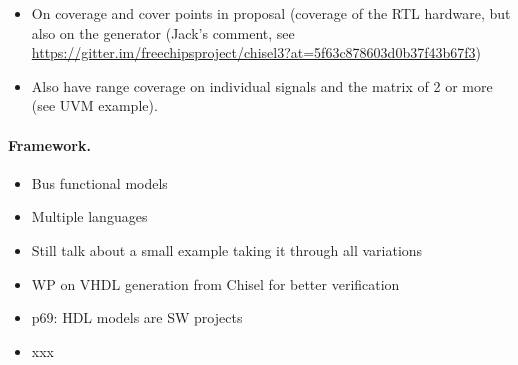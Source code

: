 \documentclass[fleqn,12pt]{article}
\begin{document}
\begin{itemize}
\item On coverage and cover points in proposal (coverage of the RTL hardware, but also on the generator (Jack's comment, see \url{https://gitter.im/freechipsproject/chisel3?at=5f63c878603d0b37f43b67f3})
\item Also have range coverage on individual signals and the matrix of 2 or more (see UVM example).
\end{itemize}

\paragraph{Framework.}

\begin{itemize}
\item Bus functional models
\item Multiple languages
\item Still talk about a small example taking it through all variations
\item WP on VHDL generation from Chisel for better verification
\item p69: HDL models are SW projects

\end{itemize}

\begin{itemize}
\item xxx
\end{itemize}






\end{document}
